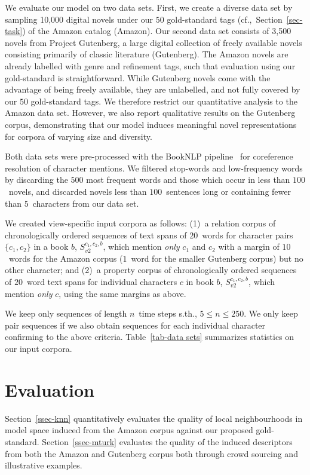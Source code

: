 \documentclass[11pt,letterpaper]{article}
\begin{document}
We evaluate our model on two data sets. First, we create a diverse data set by sampling 10,000 digital novels under our $50$ gold-standard tags (cf.,~Section~\ref{sec-task}) of the Amazon catalog (Amazon). Our second data set consists of 3,500 novels from Project Gutenberg, a large digital collection of freely available novels consisting primarily of classic literature (Gutenberg). The Amazon novels are already labelled with genre and refinement tags, such that evaluation using our gold-standard is straightforward. 
While Gutenberg novels come with the advantage of being freely available, they are unlabelled, and not fully covered by our $50$ gold-standard tags. We therefore restrict our quantitative analysis to the Amazon data set. However, we also report qualitative results on the Gutenberg corpus, demonstrating that our model induces meaningful novel representations for corpora of varying size and diversity.

Both data sets were pre-processed with the BookNLP pipeline~\cite{Bamman:2014} for coreference resolution of character mentions. We filtered stop-words and low-frequency words by discarding the $500$ most frequent words and those which occur in less than $100$~novels, and discarded novels less than $100$~sentences long or containing fewer than $5$~characters from our data set.

We created view-specific input corpora as follows: (1)~a relation corpus of chronologically ordered sequences of text spans of $20$~words for character pairs $\{c_1,c_2\}$ in a book $b$,  $S_{v2}^{c_1,c_2,b}$, which mention {\it only} $c_1$ and $c_2$ with a margin of $10$~words for the Amazon corpus ($1$~word for the smaller Gutenberg corpus) but no other character; and (2)~a  property corpus of chronologically ordered sequences of $20$~word text spans for individual characters $c$ in book $b$, $S_{v2}^{c_1,c_2,b}$, which mention {\it only} $c$, using the same margins as above. 

We keep only sequences of length $n$~time steps s.th., \mbox{$5 \leq n \leq 250$}. We only keep pair sequences if we also obtain sequences for each individual character confirming to the above criteria. Table~\ref{tab-data sets} summarizes statistics on our input corpora.

\section{Evaluation}
\label{sec-evaluation}
Section~\ref{ssec-knn} quantitatively evaluates the quality of local neighbourhoods in model space induced from the Amazon corpus against our proposed gold-standard. Section~\ref{ssec-mturk} evaluates the quality of the induced descriptors from both the Amazon and Gutenberg corpus both through crowd sourcing and illustrative examples.
\end{document}
